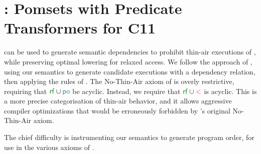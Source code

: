 \section{\PwTcTITLE: Pomsets with Predicate Transformers for C11}
\label{sec:c11}

\PwT{} can be used to generate semantic dependencies to prohibit thin-air
executions of \cXI, while preserving optimal lowering for relaxed access.  We
follow the approach of \citet{DBLP:conf/esop/PaviottiCPWOB20}, using our
semantics to generate \cXI{} candidate executions with a dependency relation,
then applying the rules of \rcXI{} \cite{DBLP:conf/pldi/LahavVKHD17}.  The
No-Thin-Air axiom of \rcXI{} is overly restrictive, requiring that
${\rrfx}\cup{\rpox}$ be acyclic.  Instead, we require that ${\rrfx}\cup{\lt}$
is acyclic.  This is a more precise categorisation of thin-air behavior, and 
it allows aggressive compiler optimizations that would be erroneously forbidden
by \rcXI's original No-Thin-Air axiom.

The chief difficulty is instrumenting our semantics to generate program
order, for use in the various axioms of \cXI{}.

